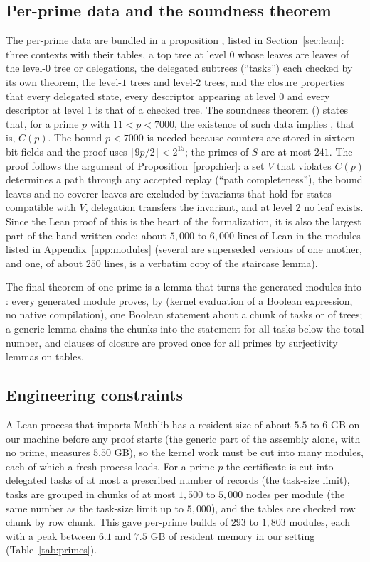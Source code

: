 \documentclass[11pt]{article}
\theoremstyle{remark}
\begin{document}
\subsection{Per-prime data and the soundness theorem}

The per-prime data are bundled in a proposition , listed in Section~\ref{sec:lean}: three contexts with their tables, a top tree at level $0$ whose leaves are leaves of the level-$0$ tree or delegations, the delegated subtrees (``tasks'') each checked by its own theorem, the level-$1$ trees and level-$2$ trees, and the closure properties that every delegated state, every descriptor appearing at level $0$ and every descriptor at level $1$ is that of a checked tree. The soundness theorem () states that, for a prime $p$ with $11<p<7000$, the existence of such data implies , that is, $C(p)$. The bound $p<7000$ is needed because counters are stored in sixteen-bit fields and the proof uses $\lfloor 9p/2\rfloor<2^{15}$; the primes of $S$ are at most $241$. The proof follows the argument of Proposition~\ref{prop:hier}: a set $V$ that violates $C(p)$ determines a path through any accepted replay (``path completeness''), the bound leaves and no-coverer leaves are excluded by invariants that hold for states compatible with $V$, delegation transfers the invariant, and at level $2$ no leaf exists. Since the Lean proof of this is the heart of the formalization, it is also the largest part of the hand-written code: about $5{,}000$ to $6{,}000$ lines of Lean in the modules listed in Appendix~\ref{app:modules} (several are superseded versions of one another, and one, of about $250$ lines, is a verbatim copy of the staircase lemma).

The final theorem of one prime is a lemma that turns the generated modules into : every generated module proves, by  (kernel evaluation of a Boolean expression, no native compilation), one Boolean statement about a chunk of tasks or of trees; a generic lemma chains the chunks into the statement for all tasks below the total number, and clauses of closure are proved once for all primes by surjectivity lemmas on tables.

\subsection{Engineering constraints}\label{sec:eng}

A Lean process that imports Mathlib has a resident size of about $5.5$ to $6$ GB on our machine before any proof starts (the generic part of the assembly alone, with no prime, measures $5.50$ GB), so the kernel work must be cut into many modules, each of which a fresh process loads. For a prime $p$ the certificate is cut into delegated tasks of at most a prescribed number of records (the task-size limit), tasks are grouped in chunks of at most $1{,}500$ to $5{,}000$ nodes per module (the same number as the task-size limit up to $5{,}000$), and the tables are checked row chunk by row chunk. This gave per-prime builds of $293$ to $1{,}803$ modules, each with a peak between $6.1$ and $7.5$ GB of resident memory in our setting (Table~\ref{tab:primes}).
\end{document}

